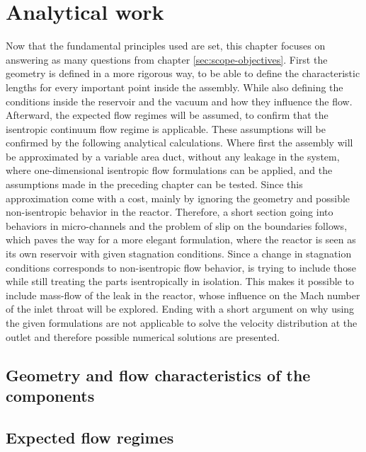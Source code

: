\section{Analytical work}
	Now that the fundamental principles used are set, this chapter focuses on answering as many questions from chapter \ref{sec:scope-objectives}.
	First the geometry is defined in a more rigorous way, to be able to define the characteristic lengths for every important point inside the assembly.
	While also defining the conditions inside the reservoir and the vacuum and how they influence the flow.
	Afterward, the expected flow regimes will be assumed, to confirm that the isentropic continuum flow regime is applicable.
	These assumptions will be confirmed by the following analytical calculations.
	Where first the assembly will be approximated by a variable area duct, without any leakage in the system, where one-dimensional isentropic flow formulations can be applied, and the assumptions made in the preceding chapter can be tested.
	Since this approximation come with a cost, mainly by ignoring the geometry and possible non-isentropic behavior in the reactor.
	Therefore, a short section going into behaviors in micro-channels and the problem of slip on the boundaries follows, which paves the way for a more elegant formulation, where the reactor is seen as its own reservoir with given stagnation conditions.
	Since a change in stagnation conditions corresponds to non-isentropic flow behavior, is trying to include those while still treating the parts isentropically in isolation.
	This makes it possible to include mass-flow of the leak in the reactor, whose influence on the Mach number of the inlet throat will be explored.
	Ending with a short argument on why using the given formulations are not applicable to solve the velocity distribution at the outlet and therefore possible numerical solutions are presented.

\subsection{Geometry and flow characteristics of the components}\label{sec:geometry}
	

\subsection{Expected flow regimes}\label{sec:expected-flow-regimes}
	
	\newpage

